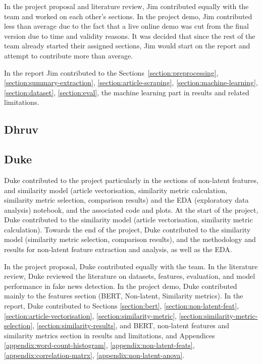 \documentclass{article}
\begin{document}
\begin{appendices}
In the project proposal and literature review, Jim contributed equally with the team and worked on each other's sections. In the project demo, Jim contributed less than average due to the fact that a live online demo was cut from the final version due to time and validity reasons. It was decided that since the rest of the team already started their assigned sections, Jim would start on the report and attempt to contribute more than average.

In the report Jim contributed to the Sections~\ref{section:preprocessing}, \ref{section:summary-extraction}, \ref{section:article-scraping}, \ref{section:machine-learning}, \ref{section:dataset}, \ref{section:eval}, the machine learning part in results and related limitations.

\subsection{Dhruv}


\subsection{Duke}
Duke contributed to the project particularly in the sections of non-latent features, and similarity model (article vectorisation, similarity metric calculation, similarity metric selection, comparison results) and the EDA (exploratory data analysis) notebook, and the associated code and plots. At the start of the project, Duke contributed to the similarity model (article vectorisation, similarity metric calculation). Towards the end of the project, Duke contributed to the similarity model (similarity metric selection, comparison results), and the methodology and results for non-latent feature extraction and analysis, as well as the EDA.

In the project proposal, Duke contributed equally with the team. In the literature review, Duke reviewed the literature on datasets, features, evaluation, and model performance in fake news detection. In the project demo, Duke contributed mainly to the features section (BERT, Non-latent, Similarity metrics). In the report, Duke contributed to Sections \ref{section:bert}, \ref{section:non-latent-feat}, \ref{section:article-vectorisation}, \ref{section:similarity-metric}, \ref{section:similarity-metric-selection}, \ref{section:similarity-results}, and BERT, non-latent features and similarity metrics section in results and limitations, and Appendices \ref{appendix:word-count-histogram}, \ref{appendix:non-latent-feats}, \ref{appendix:correlation-matrx}, \ref{appendix:non-latent-anova}.


\end{appendices}
\end{document}
